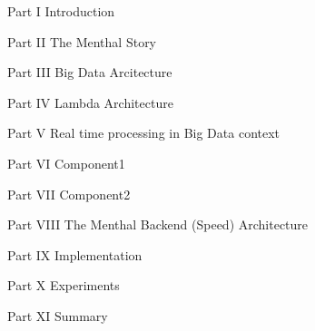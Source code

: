 Part I Introduction

Part II The Menthal Story

Part III Big Data Arcitecture

Part IV Lambda Architecture

Part V Real time processing in Big Data context

Part VI Component1

Part VII Component2

Part VIII The Menthal Backend (Speed) Architecture

Part IX Implementation

Part X Experiments

Part XI Summary